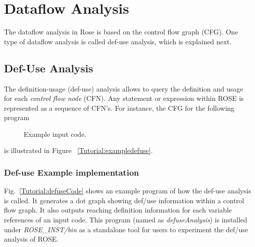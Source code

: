 \chapter{Dataflow Analysis}

The dataflow analysis in Rose is based on the control flow graph (CFG).
One type of dataflow analysis is called def-use analysis, which is explained next.

\section{Def-Use Analysis}

The definition-usage (def-use) analysis allows to query the definition
and usage for each \emph{control flow node} (CFN).
Any statement or expression within ROSE is represented as a sequence of CFN's.
For instance, the CFG for the following program



\begin{figure}[!h]
{\indent
{\mySmallFontSize

\begin{latexonly}
   
\end{latexonly}

\begin{htmlonly}
   
\end{htmlonly}

}
}
\caption{Example input code.}
\label{Tutorial:exampledefuseInput}
\end{figure}

is illustrated in Figure ~\ref{Tutorial:exampledefuse}.

\subsection{Def-use Example implementation}

Fig.~\ref{Tutorial:defuseCode} shows an example program of how the def-use analysis
is called. It generates a dot graph showing def/use information within
a control flow graph. 
It also outputs reaching definition information for each variable
references of an input code. This program (named as \textit{defuseAnalysis})
is installed under \textit{ROSE\_INST/bin} as a standalone tool for users
to experiment the def/use analysis of ROSE.

